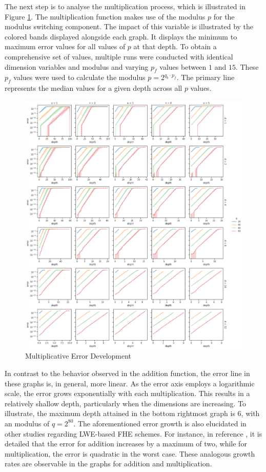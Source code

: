 The next step is to analyse the multiplication process, which is illustrated in Figure \ref{fig:MulErrorDev}. The multiplication function makes use of the modulus $p$ for the modulus switching component. The impact of this variable is illustrated by the colored bands displayed alongside each graph. It displays the minimum to maximum error values for all values of $p$ at that depth. To obtain a comprehensive set of values, multiple runs were conducted with identical dimension variables and modulus and varying $p_f$ values between $1$ and $15$. These $p_f$ values were used to calculate the modulus $p=2^{q_b\cdot p_f}$. The primary line represents the median values for a given depth across all $p$ values.

\begin{figure}[htp]
  \centering
  \includegraphics[scale=0.4]{images/MulErrorDevelopment.png}
  \caption[Multiplicative Error Development]{Multiplicative Error Development}
  \label{fig:MulErrorDev}
\end{figure}

In contrast to the behavior observed in the addition function, the error line in these graphs is, in general, more linear. As the error axis employs a logarithmic scale, the error grows exponentially with each multiplication. This results in a relatively shallow depth, particularly when the dimensions are increasing. To illustrate, the maximum depth attained in the bottom rightmost graph is $6$, with an modulus of $q = 2^{80}$. The aforementioned error growth is also elucidated in other studies regarding LWE-based FHE schemes. For instance, in reference \cite{FHEwoBottstrapping}, it is detailed that the error for addition increases by a maximum of two, while for multiplication, the error is quadratic in the worst case. These analogous growth rates are observable in the graphs for addition and multiplication.

